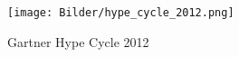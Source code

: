 	\begin{figure}[!htb]
		\centering
		\texttt{[image: Bilder/hype\_cycle\_2012.png]}%
		\caption[Gartner Hype Cycle 2012]{Gartner Hype Cycle 2012\footnotemark}%
		\label{pic:hype_cycle}%
	\end{figure}
